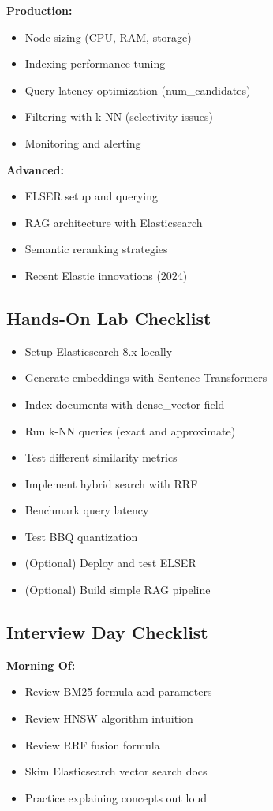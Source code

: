 \documentclass[10pt]{article}
\begin{document}
\textbf{Production:}
\begin{itemize}[label=$\square$]
\item Node sizing (CPU, RAM, storage)
\item Indexing performance tuning
\item Query latency optimization (num\_candidates)
\item Filtering with k-NN (selectivity issues)
\item Monitoring and alerting
\end{itemize}

\textbf{Advanced:}
\begin{itemize}[label=$\square$]
\item ELSER setup and querying
\item RAG architecture with Elasticsearch
\item Semantic reranking strategies
\item Recent Elastic innovations (2024)
\end{itemize}

\subsection{Hands-On Lab Checklist}

\begin{itemize}[label=$\square$]
\item Setup Elasticsearch 8.x locally
\item Generate embeddings with Sentence Transformers
\item Index documents with dense\_vector field
\item Run k-NN queries (exact and approximate)
\item Test different similarity metrics
\item Implement hybrid search with RRF
\item Benchmark query latency
\item Test BBQ quantization
\item (Optional) Deploy and test ELSER
\item (Optional) Build simple RAG pipeline
\end{itemize}

\subsection{Interview Day Checklist}

\textbf{Morning Of:}
\begin{itemize}[label=$\square$]
\item Review BM25 formula and parameters
\item Review HNSW algorithm intuition
\item Review RRF fusion formula
\item Skim Elasticsearch vector search docs
\item Practice explaining concepts out loud
\end{itemize}
\end{document}
